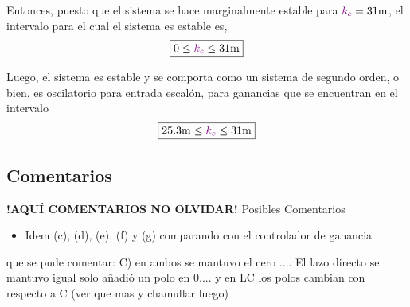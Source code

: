 Entonces, puesto que el sistema se hace marginalmente estable para $\mora{k_{c}} = 31\unit{m}$,
el intervalo para el cual el sistema es estable es,
\begin{equation}
    \boxed{0 \leq \mora{k_{c}} \leq 31\unit{m}}
\end{equation}

Luego, el sistema es estable y se comporta como un sistema de segundo orden, o
bien, es oscilatorio para entrada escalón, para ganancias que se encuentran en
el intervalo
\begin{equation}
    \boxed{25.3\unit{m} \leq \mora{k_{c}} \leq 31\unit{m}}
\end{equation}

\FloatBarrier
\subsection{Comentarios}

\textbf{!AQUÍ COMENTARIOS NO OLVIDAR!}
Posibles Comentarios
\begin{itemize}
    \item Idem (c), (d), (e), (f) y (g) comparando con el controlador de ganancia
\end{itemize}


que se pude comentar:
 C) en ambos se mantuvo el cero .... El lazo directo se mantuvo igual solo añadió un polo en 0.... y en LC los polos cambian con respecto a C  (ver que mas y chamullar luego)
